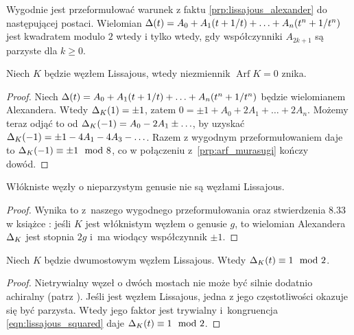 Wygodnie jest przeformułować warunek z faktu \ref{prp:lissajous_alexander} do następującej postaci.
Wielomian $\Delta(t) = A_0 + A_1(t+1/t) + \ldots + A_n(t^n + 1/t^n)$ jest kwadratem modulo $2$ wtedy i tylko wtedy, gdy współczynniki $A_{2k+1}$ są parzyste dla $k \ge 0$.

\begin{corollary}
%
    Niech $K$ będzie węzłem Lissajous, wtedy niezmiennik $\operatorname{Arf} K = 0$ znika.
\end{corollary}

\begin{proof}
    Niech $\Delta(t) = A_0 + A_1(t+1/t) + \ldots + A_n(t^n + 1/t^n)$ będzie  wielomianem Alexandera.
    Wtedy $\Delta_K(1) = \pm 1$, zatem $0 = \pm 1 + A_0 + 2A_1 + \ldots + 2A_n$.
    Możemy teraz odjąć to od $\Delta_K(-1) = A_0 - 2A_1 \pm \ldots$, by uzyskać $\Delta_K(-1) = \pm 1 - 4A_1 - 4A_3 - \ldots$.
    Razem z wygodnym przeformułowaniem daje to $\Delta_K(-1) \equiv \pm 1 \mod 8$, co w połączeniu z~\ref{prp:arf_murasugi} kończy dowód.
\end{proof}

\begin{corollary}
%
\label{cor:lissajous_fibered}%
    Włókniste węzły o nieparzystym genusie nie są węzłami Lissajous.
\end{corollary}

\begin{proof}
    Wynika to z~naszego wygodnego przeformułowania oraz stwierdzenia 8.33 w książce \cite{burde14}: jeśli $K$ jest włóknistym węzłem o genusie $g$, to wielomian Alexandera $\Delta_K$ jest stopnia $2g$ i~ma wiodący współczynnik $\pm 1$.
\end{proof}

\begin{corollary}
%
\label{cor:lissajous_twobridge}%
    Niech $K$ będzie dwumostowym węzłem Lissajous.
    Wtedy $\Delta_K(t) \equiv 1 \mod 2$.
\end{corollary}

\begin{proof}
    Nietrywialny węzeł o dwóch mostach nie może być silnie dodatnio achiralny (patrz \cite{hartley79}).
    Jeśli jest węzłem Lissajous, jedna z jego częstotliwości okazuje się być parzysta.
    Wtedy jego faktor jest trywialny i~kongruencja \ref{eqn:lissajous_squared} daje $\Delta_K(t) \equiv 1 \mod 2$.
\end{proof}

